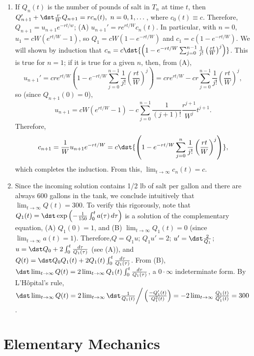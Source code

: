 \documentclass[openany]{book}
\newenvironment{sectionSolutions}{
 \begin{enumerate}[item-label={\thesection.\arabic{enumi}.}]
}{
 \end{enumerate}
}
\begin{document}
\begin{sectionSolutions}
\item
If $Q_n(t)$ is the number of pounds of salt in $T_n$ at time $t$, then
$Q_{n+1}'+\dst\frac{r}{ W}Q_{n+1}=rc_n(t),\ n=0,1,\dots$, where
$c_0(t)\equiv c$. Therefore,$Q_{n+1}=u_{n+1}e^{-rt/w}$;
(A) $u_{n+1}'=re^{rt/W}c_n(t)$. In particular, with $n=0$,
$u_1=cW(e^{rt/W}-1)$, so $Q_1=cW(1-e^{-rt/W})$  and
$c_1=c(1-e^{-rt/W})$. We will shown by induction that
$c_n=c\dst{\left(1-e^{-rt/W}\sum_{j=0}^{n-1}\frac{1}{
j!}\left(\frac{rt}{ W}\right)^j\right)}$.
 This is true for $n=1$; if it is
true for a given $n$, then, from (A),
\[
u_{n+1}'=cre^{rt/W}
\left(1-e^{-rt/W}\sum_{j=0}^{n-1}\frac{1}{
j!}\left(\frac{rt}{ W}\right)^j\right)
=cre^{rt/W}-cr
\sum_{j=0}^{n-1}\frac{1}{
j!}\left(\frac{rt}{ W}\right)^j,
\]
so (since $Q_{n+1}(0)=0$),
\[
u_{n+1}=cW(e^{rt/W}-1)-c\sum_{j=0}^{n-1}\frac{1}{(j+1)!}
\frac{r^{j+1}}{ W^j}t^{j+1}.
\]
Therefore,
\[
c_{n+1}=\frac{1}{ W}u_{n+1}e^{-rt/W}=
c\dst{\left(1-e^{-rt/W}\sum_{j=0}^n\frac{1}{
j!}\left(\frac{rt}{ W}\right)^j\right)},
\]
which completes the induction. From this, $\lim_{t\to\infty}c_n(t)=c$.



\item
Since the incoming solution contains 1/2 lb of salt per gallon
and there are always 600 gallons in the tank, we conclude
intuitively that $\lim_{t\to\infty}Q(t)=300$.
To verify this rigorously,
note that $Q_1(t)=\dst\exp\left(-\frac{1}{150}\int_0^t
a(\tau)\,d\tau\right)$ is a solution of the complementary equation,
(A) $Q_1(0)=1$, and (B) $\lim_{t\to\infty}Q_1(t)=0$ (since
$\lim_{t\to\infty}a(t)=1$).  Therefore,$Q=Q_1u$; $Q_1u'=2$;
$u'=\dst\frac{2}{ Q_1}$;
$u=\dst Q_0+2\int_0^t\frac{d\tau}{ Q_1(\tau)}$ (see (A)), and
$Q(t)=\dst Q_0Q_1(t)+2Q_1(t)\int_0^t\frac{d\tau}{ Q_1(\tau)}$.
From (B),
$\dst\lim_{t\to\infty}Q(t)=2\lim_{t\to\infty}Q_1(t)
\int_0^t\frac{d\tau}{ Q_1(\tau)}$, a $0\cdot\infty$ indeterminate
form. By L'Hôpital's rule,
$\dst\lim_{t\to\infty}Q(t)=2\lim_{t\to\infty}
\dst\frac{1}{ Q_1(t)}\bigg/\left(\frac{-Q_1'(t)}{ Q_1^2(t)}\right)
=-2\lim_{t\to\infty}\frac{Q_1(t)}{ Q_1'(t)}=300$.
\end{sectionSolutions}

\section{Elementary Mechanics}
\end{document}
